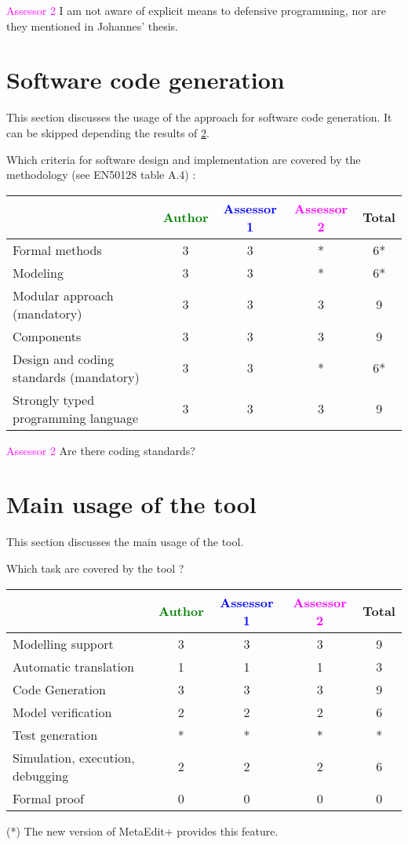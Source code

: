 \textcolor{magenta}{Assessor 2} I am not aware of explicit means to defensive
programming, nor are they mentioned in Johannes' thesis.

\section{Software code generation}
This section discusses the usage of the approach for software code generation.
It can be skipped depending the results of \ref{main_usage}.

Which criteria for software design and implementation are covered by the methodology
(see EN50128 table A.4) :

\begin{tabular}{|l | c | c | c | c|}
\hline
& \textcolor{green}{Author} & \textcolor{blue}{Assessor 1} & \textcolor{magenta}{Assessor 2} & Total \\
\hline
Formal methods  &3 &3 & * & 6* \\
\hline 
Modeling  &3 &3 & * & 6* \\
\hline
Modular approach (mandatory) &3 &3 & 3& 9 \\
\hline
Components &3 &3 & 3& 9 \\
\hline
Design and coding standards (mandatory) &3 &3 & *& 6* \\
\hline
Strongly typed programming language &3 &3 & 3& 9 \\
\hline

\end{tabular}

\textcolor{magenta}{Assessor 2} Are there coding standards?

\section{Main usage of the tool}
\label{main_usage}

This section discusses the main usage of the tool.

Which task are covered by the tool ?


\begin{tabular}{|l | c | c | c | c|}
\hline
& \textcolor{green}{Author} & \textcolor{blue}{Assessor 1} & \textcolor{magenta}{Assessor 2} & Total \\
\hline 
Modelling support &3 &3 & 3& 9 \\
\hline
Automatic translation  &1 &1 & 1& 3 \\
\hline
Code Generation  &3 &3 & 3& 9 \\
\hline
Model verification &2 &2 & 2& 6 \\
\hline
Test generation &* &* & *& * \\
\hline
Simulation, execution, debugging &2 &2 & 2& 6 \\
\hline
Formal proof &0 &0 & 0& 0 \\
\hline
\end{tabular}
\begin{author_comment}
(*) The new version of MetaEdit+ provides this feature.
\end{author_comment}

